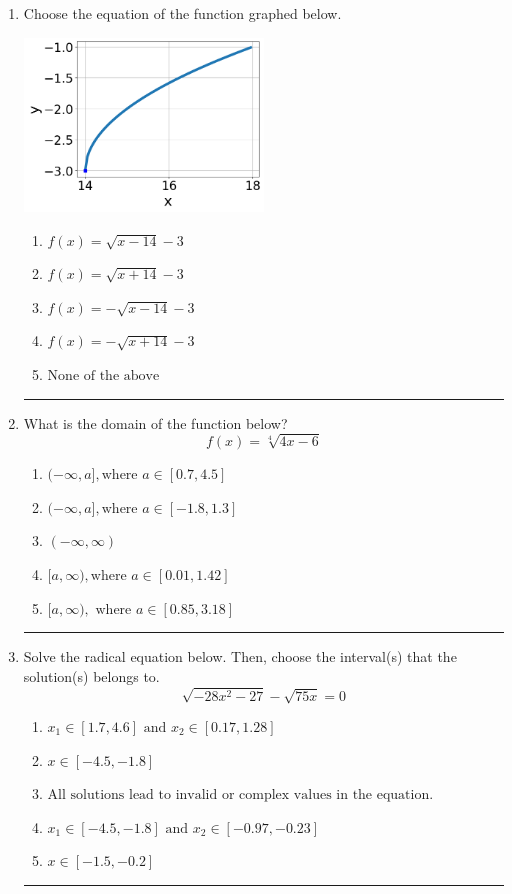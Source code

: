 \documentclass[14pt]{extbook}
\newcommand{\litem}[1]{\item#1\hspace*{-1cm}\rule{\textwidth}{0.4pt}}
\begin{document}
\begin{enumerate}
{\begin{enumerate}[label=\Alph*.]
\end{enumerate} }
\litem{
Choose the equation of the function graphed below.
\begin{center}
    \includegraphics[width=0.5\textwidth]{../Figures/radicalGraphToEquationCopyC.png}
\end{center}
\begin{enumerate}[label=\Alph*.]
\item \( f(x) = \sqrt{x - 14} - 3 \)
\item \( f(x) = \sqrt{x + 14} - 3 \)
\item \( f(x) = - \sqrt{x - 14} - 3 \)
\item \( f(x) = - \sqrt{x + 14} - 3 \)
\item \( \text{None of the above} \)

\end{enumerate} }
\litem{
What is the domain of the function below?\[ f(x) = \sqrt[4]{4 x - 6} \]\begin{enumerate}[label=\Alph*.]
\item \( (-\infty, a], \text{where } a \in [0.7, 4.5] \)
\item \( (-\infty, a], \text{where } a \in [-1.8, 1.3] \)
\item \( (-\infty, \infty) \)
\item \( [a, \infty), \text{where } a \in [0.01, 1.42] \)
\item \( [a, \infty), \text{ where } a \in [0.85, 3.18] \)

\end{enumerate} }
\litem{
Solve the radical equation below. Then, choose the interval(s) that the solution(s) belongs to.\[ \sqrt{-28 x^2 - 27} - \sqrt{75 x} = 0 \]\begin{enumerate}[label=\Alph*.]
\item \( x_1 \in [1.7, 4.6] \text{ and } x_2 \in [0.17,1.28] \)
\item \( x \in [-4.5,-1.8] \)
\item \( \text{All solutions lead to invalid or complex values in the equation.} \)
\item \( x_1 \in [-4.5, -1.8] \text{ and } x_2 \in [-0.97,-0.23] \)
\item \( x \in [-1.5,-0.2] \)


\end{enumerate}}
\end{enumerate}
\end{document}
